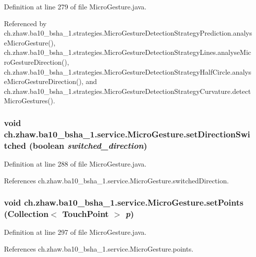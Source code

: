 Definition at line 279 of file MicroGesture.java.

Referenced by ch.zhaw.ba10\_\-bsha\_\-1.strategies.MicroGestureDetectionStrategyPrediction.analyseMicroGesture(), ch.zhaw.ba10\_\-bsha\_\-1.strategies.MicroGestureDetectionStrategyLines.analyseMicroGestureDirection(), ch.zhaw.ba10\_\-bsha\_\-1.strategies.MicroGestureDetectionStrategyHalfCircle.analyseMicroGestureDirection(), and ch.zhaw.ba10\_\-bsha\_\-1.strategies.MicroGestureDetectionStrategyCurvature.detectMicroGestures().\hypertarget{classch_1_1zhaw_1_1ba10__bsha__1_1_1service_1_1MicroGesture_ad4647452ba6cbeca4766bf81dfa0fc7d}{
\subsubsection[{setDirectionSwitched}]{\setlength{\rightskip}{0pt plus 5cm}void ch.zhaw.ba10\_\-bsha\_\-1.service.MicroGesture.setDirectionSwitched (boolean {\em switched\_\-direction})}}
\label{classch_1_1zhaw_1_1ba10__bsha__1_1_1service_1_1MicroGesture_ad4647452ba6cbeca4766bf81dfa0fc7d}


Definition at line 288 of file MicroGesture.java.

References ch.zhaw.ba10\_\-bsha\_\-1.service.MicroGesture.switchedDirection.\hypertarget{classch_1_1zhaw_1_1ba10__bsha__1_1_1service_1_1MicroGesture_a71ef1e00c42a00874e551707d73de579}{
\subsubsection[{setPoints}]{\setlength{\rightskip}{0pt plus 5cm}void ch.zhaw.ba10\_\-bsha\_\-1.service.MicroGesture.setPoints (Collection$<$ {\bf TouchPoint} $>$ {\em p})}}
\label{classch_1_1zhaw_1_1ba10__bsha__1_1_1service_1_1MicroGesture_a71ef1e00c42a00874e551707d73de579}


Definition at line 297 of file MicroGesture.java.

References ch.zhaw.ba10\_\-bsha\_\-1.service.MicroGesture.points.


